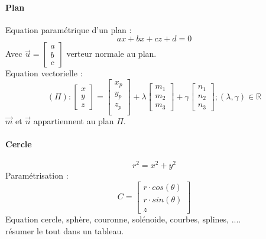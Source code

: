 \documentclass[12pt,a4paper,twoside]{article}
\numberwithin{equation}{subsection}
\begin{document}
\paragraph{Plan}
Equation paramétrique d'un plan :
\begin{equation}
ax+bx+cz+d=0
\end{equation}
Avec $\vec{u}=\begin{bmatrix}
a\\ b\\ c
\end{bmatrix}$ verteur normale au plan.\\
Equation vectorielle :
\begin{equation}
(\Pi):
\begin{bmatrix}
x \\
y\\
z
\end{bmatrix}
=
\begin{bmatrix}
x_p\\
y_p\\
z_p\\
\end{bmatrix}
+\lambda
\begin{bmatrix}
m_1\\
m_2 \\
m_3
\end{bmatrix}
+ \gamma
\begin{bmatrix}
n_1\\
n_2 \\
n_3
\end{bmatrix}; (\lambda,\gamma) \in \mathbb{R}
\end{equation}
$\vec{m}$ et $\vec{n}$ appartiennent au plan $\Pi$.
\paragraph{Cercle}

\begin{equation}
r^2=x^2+y^2
\end{equation}
Paramétrisation :
\begin{equation}
C =
\begin{bmatrix}
r \cdot cos(\theta) \\
r \cdot sin(\theta)\\
z
\end{bmatrix}
\end{equation}
Equation cercle, sphère, couronne, solénoide, courbes, splines, ....\\

résumer le tout dans un tableau. 
\end{document}
